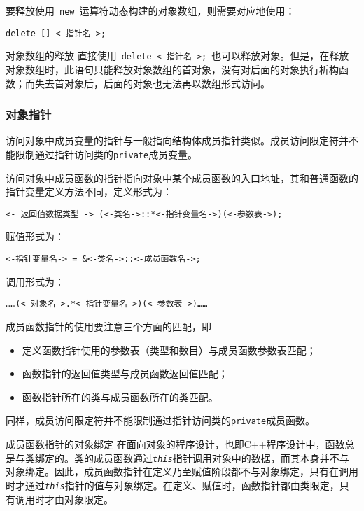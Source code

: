 \documentclass[10pt, a4paper, oneside, fontset=none]{ctexart}
\theoremstyle{plain}
\theoremstyle{definition}
\newcommand{\zhu}[2][]{\begin{note}{#1}\xiu #2\end{note}}
\begin{document}
要释放使用~\lstinline|new|~运算符动态构建的对象数组，则需要对应地使用：
\begin{lstlisting}[style=intro]
	delete [] <-指针名->;
\end{lstlisting}

\zhu[对象数组的释放]{
	直接使用~\lstinline|delete <-指针名->;|~也可以释放对象。但是，在释放对象数组时，此语句只能释放对象数组的首对象，没有对后面的对象执行析构函数；而失去首对象后，后面的对象也无法再以数组形式访问。
}

\subsubsection{对象指针}

访问对象中成员变量的指针与一般指向结构体成员指针类似。成员访问限定符并不能限制通过指针访问类的\texttt{private}成员变量。

访问对象中成员函数的指针指向对象中某个成员函数的入口地址，其和普通函数的指针变量定义方法不同，定义形式为：
\begin{lstlisting}[style=intro]
	<- 返回值数据类型 -> (<-类名->::*<-指针变量名->)(<-参数表->);
\end{lstlisting}
赋值形式为：
\begin{lstlisting}[style=intro]
	<-指针变量名-> = &<-类名->::<-成员函数名->;
\end{lstlisting}
调用形式为：
\begin{lstlisting}[style=intro]
	……(<-对象名->.*<-指针变量名->)(<-参数表->)……
\end{lstlisting}

成员函数指针的使用要注意三个方面的匹配，即
\begin{itemize}
	\item 定义函数指针使用的参数表（类型和数目）与成员函数参数表匹配；
	\item 函数指针的返回值类型与成员函数返回值匹配；
	\item 函数指针所在的类与成员函数所在的类匹配。
\end{itemize}
同样，成员访问限定符并不能限制通过指针访问类的\texttt{private}成员函数。

\zhu[成员函数指针的对象绑定]{
	在面向对象的程序设计，也即C++程序设计中，函数总是与类绑定的。类的成员函数通过\texttt{\textit{this}}指针调用对象中的数据，而其本身并不与对象绑定。因此，成员函数指针在定义乃至赋值阶段都不与对象绑定，只有在调用时才通过\texttt{\textit{this}}指针的值与对象绑定。在定义、赋值时，函数指针都由类限定，只有调用时才由对象限定。
}
\end{document}
